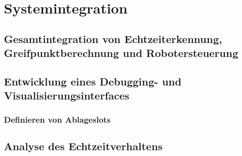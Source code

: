 
\chapter{Systemintegration}

\section{Gesamtintegration von Echtzeiterkennung, Greifpunktberechnung und Robotersteuerung}

\section{Entwicklung eines Debugging- und Visualisierungsinterfaces}

\subsection{Definieren von Ablageslots}


\section{Analyse des Echtzeitverhaltens}